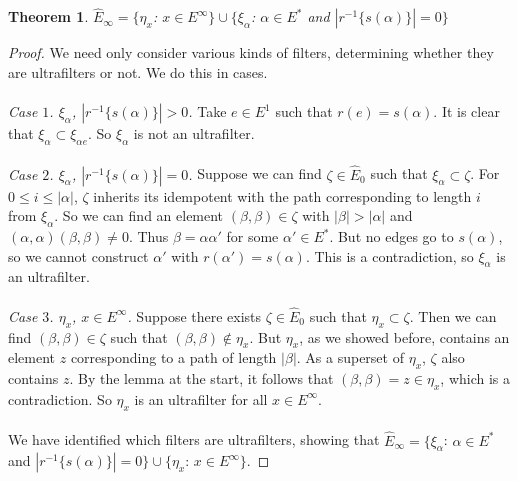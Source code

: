 \documentclass{article}
\newtheorem{theorem}{Theorem}[section]
\theoremstyle{definition}
\begin{document}
\begin{theorem} $\hat{E}_\infty = \{\eta_x$: $x \in E^\infty\} \cup \{\xi_\alpha$: $\alpha \in E^*$ and $|r^{-1}\{s(\alpha)\}| = 0 \}$ \end{theorem}
\begin{proof}
    We need only consider various kinds of filters, determining whether they are ultrafilters or not. We do this in cases.
    \\ \\
    \textit{Case $1$. $\xi_\alpha$, $|r^{-1}\{s(\alpha)\}| > 0$.} Take $e \in E^1$ such that $r(e) = s(\alpha)$. It is clear that
    $\xi_\alpha \subset \xi_{\alpha e}$. So $\xi_\alpha$ is not an ultrafilter.
    \\ \\
    \textit{Case $2$. $\xi_\alpha$, $|r^{-1}\{s(\alpha)\}| = 0$.} Suppose we can find $\zeta \in \hat{E}_0$ such that $\xi_\alpha \subset \zeta$.
    For $0 \leq i \leq |\alpha|$, $\zeta$ inherits its idempotent with the path corresponding to length $i$ from $\xi_\alpha$. So we can find an element $(\beta, \beta) \in \zeta$ with
    $|\beta| > |\alpha|$ and $(\alpha, \alpha)(\beta, \beta) \neq 0$. Thus $\beta = \alpha \alpha'$ for some $\alpha' \in E^*$. But no edges go to $s(\alpha)$, so we cannot
    construct $\alpha'$ with $r(\alpha') = s(\alpha)$. This is a contradiction, so $\xi_\alpha$ is an ultrafilter.
    \\ \\
    \textit{Case $3$. $\eta_x$, $x \in E^\infty$.} Suppose there exists $\zeta \in \hat{E}_0$ such that $\eta_x \subset \zeta$. Then we can find
    $(\beta, \beta) \in \zeta$ such that $(\beta, \beta) \notin \eta_x$. But $\eta_x$, as we showed before, contains an element $z$ corresponding to
    a path of length $|\beta|$. As a superset of $\eta_x$, $\zeta$ also contains $z$. By the lemma at the start, it follows that $(\beta, \beta) = z \in \eta_x$,
    which is a contradiction. So $\eta_x$ is an ultrafilter for all $x \in E^\infty$.
    \\ \\
    We have identified which filters are ultrafilters, showing that $\hat{E}_\infty = \{\xi_\alpha$: $\alpha \in E^*$ and $|r^{-1}\{s(\alpha)\}| = 0\} \cup \{\eta_x$: $x \in E^\infty\}$.
\end{proof}
\end{document}
